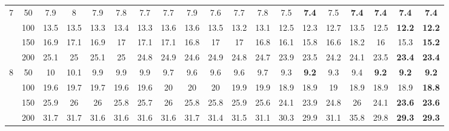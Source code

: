 \begin{table}[htbp]
\begin{adjustbox}{angle=90}
{\begin{tabular}{|c|c|c|c|c|c|c|c|c|c|c|c|c|c|c|c|c|c|c|}
    7 & 50 & 7.9 & 8 & 7.9 & 7.8 & 7.7 & 7.7 & 7.9 & 7.6 & 7.7 & 7.8 & 7.5 & \textbf{7.4} & 7.5 & \textbf{7.4} & \textbf{7.4} & \textbf{7.4} & \textbf{7.4} \\ 
     & 100 & 13.5 & 13.5 & 13.3 & 13.4 & 13.3 & 13.6 & 13.6 & 13.5 & 13.2 & 13.1 & 12.5 & 12.3 & 12.7 & 13.5 & 12.5 & \textbf{12.2} & \textbf{12.2} \\ 
     & 150 & 16.9 & 17.1 & 16.9 & 17 & 17.1 & 17.1 & 16.8 & 17 & 17 & 16.8 & 16.1 & 15.8 & 16.6 & 18.2 & 16 & 15.3 & \textbf{15.2} \\ 
     & 200 & 25.1 & 25 & 25.1 & 25 & 24.8 & 24.9 & 24.6 & 24.9 & 24.8 & 24.7 & 23.9 & 23.5 & 24.2 & 24.1 & 23.5 & \textbf{23.4} & \textbf{23.4} \\ \hline
    8 & 50 & 10 & 10.1 & 9.9 & 9.9 & 9.9 & 9.7 & 9.6 & 9.6 & 9.6 & 9.7 & 9.3 & \textbf{9.2} & 9.3 & 9.4 & \textbf{9.2} & \textbf{9.2} & \textbf{9.2} \\ 
     & 100 & 19.6 & 19.7 & 19.7 & 19.6 & 19.6 & 20 & 20 & 20 & 19.9 & 19.9 & 18.9 & 18.9 & 19 & 18.9 & 18.9 & 18.9 & \textbf{18.8} \\ 
     & 150 & 25.9 & 26 & 26 & 25.8 & 25.7 & 26 & 25.8 & 25.8 & 25.9 & 25.6 & 24.1 & 23.9 & 24.8 & 26 & 24.1 & \textbf{23.6} & \textbf{23.6} \\ 
     & 200 & 31.7 & 31.7 & 31.6 & 31.6 & 31.6 & 31.6 & 31.7 & 31.4 & 31.5 & 31.1 & 30.3 & 29.9 & 31.1 & 35.8 & 29.8 & \textbf{29.3} & \textbf{29.3} \\ \hline
    \end{tabular}}
    \end{adjustbox}
    \label{exp:literature_all_bins}
    \end{table}
    